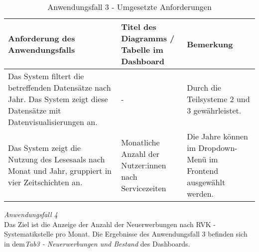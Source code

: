 \begingroup
    \setlength{\tabcolsep}{12pt} %
    \renewcommand{\arraystretch}{1.5} 
    \begin{table}[H]
        \centering
        \begin{adjustbox}{max width=\textwidth}
        \begin{tabular}{p{}p{}p{}}
           \toprule
           Anforderung des Anwendungsfalls        &Titel des Diagramms / Tabelle im Dashboard &Bemerkung\\
           \midrule
           Das System filtert die betreffenden Datensätze nach Jahr. Das System zeigt diese Datensätze mit Datenvisualisierungen an.&-&Durch die Teilsysteme 2  und 3 gewährleistet.\\
           Das System zeigt die Nutzung des Lesesaals nach Monat und Jahr, gruppiert in vier Zeitschichten an.&Monatliche Anzahl der Nutzer:innen nach Servicezeiten& Die Jahre können im Dropdown-Menü im Frontend ausgewählt werden.\\

        \bottomrule
        \end{tabular}
        \end{adjustbox}
        \caption{%
            Anwendungsfall 3 - Umgesetzte Anforderungen
        }
        \label{tab:Anwendungsfall 3 - Umgesetzte Anforderungen}
        \end{table}


\noindent
\textit{Anwendungsfall 4}\\
Das Ziel ist die Anzeige der Anzahl der Neuerwerbungen nach RVK -Systematikstelle pro Monat.
Die Ergebnisse des Anwendungsfall 3 befinden sich in dem\textit{Tab3 - Neuerwerbungen und Bestand} des Dashboards.

